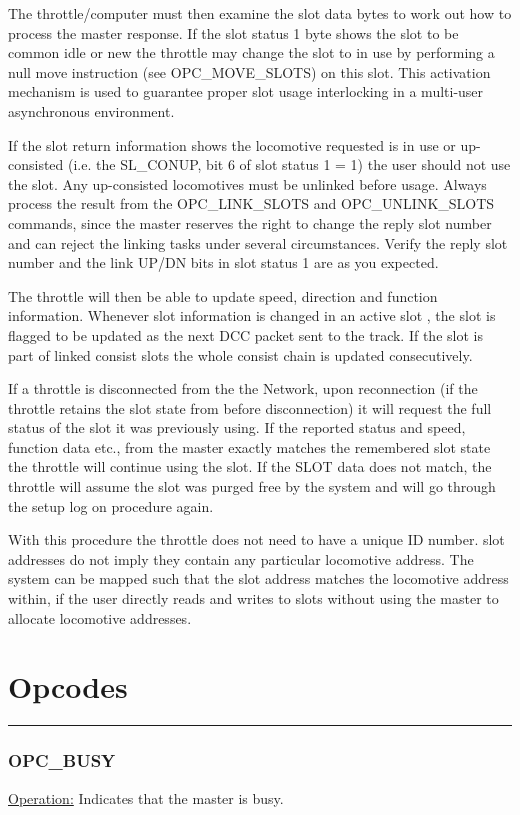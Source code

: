 The throttle/computer must then examine the slot data bytes to work out how to process the master response. If the slot status 1 byte shows the slot to be common idle or new the throttle may change the slot to in use by performing a null move instruction (see OPC\_MOVE\_SLOTS) on this slot. This activation mechanism is used to guarantee proper slot usage interlocking in a multi-user asynchronous environment.

If the slot return information shows the locomotive requested is in use or up-consisted (i.e. the SL\_CONUP, bit 6 of slot status 1 = 1) the user should not use the slot. Any up-consisted locomotives must be unlinked before usage. Always process the result from the OPC\_LINK\_SLOTS and OPC\_UNLINK\_SLOTS commands, since the master reserves the right to change the reply slot number and can reject the linking tasks under several circumstances. Verify the reply slot number and the link UP/DN bits in slot status 1 are as you expected.

The throttle will then be able to update speed, direction and function information. Whenever slot information is changed in an active slot , the slot is flagged to be updated as the next DCC packet sent to the track. If the slot is part of linked consist slots the whole consist chain is updated consecutively.

If a throttle is disconnected from the the Network, upon reconnection (if the throttle retains the slot state from before disconnection) it will request the full status of the slot it was previously using. If the reported status and speed, function data etc., from the master exactly matches the remembered slot state the throttle will continue using the slot. If the SLOT data does not match, the throttle will assume the slot was purged free by the system and will go through the setup log on procedure again.

With this procedure the throttle does not need to have a unique ID number. slot addresses do not imply they contain any particular locomotive address. The system can be mapped such that the slot address matches the locomotive address within, if the user directly reads and writes to slots without using the master to allocate locomotive addresses.

\section{Opcodes}

\rule{15.1cm}{0.4pt}
\subsubsection{OPC\_BUSY}
\underline{Operation:} Indicates that the master is busy.

